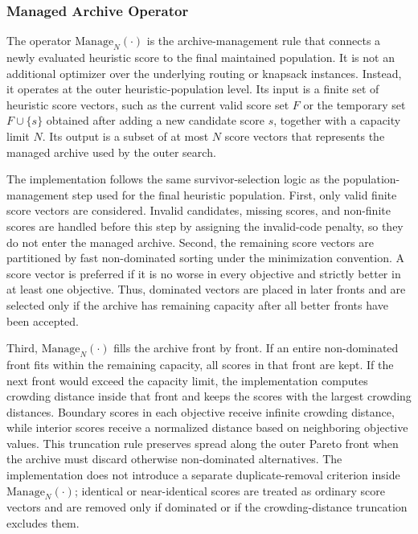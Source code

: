 \subsubsection{Managed Archive Operator}

The operator $\mathrm{Manage}_N(\cdot)$ is the archive-management rule that connects a newly evaluated heuristic score to the final maintained population. It is not an additional optimizer over the underlying routing or knapsack instances. Instead, it operates at the outer heuristic-population level. Its input is a finite set of heuristic score vectors, such as the current valid score set $F$ or the temporary set $F\cup\{s\}$ obtained after adding a new candidate score $s$, together with a capacity limit $N$. Its output is a subset of at most $N$ score vectors that represents the managed archive used by the outer search.

The implementation follows the same survivor-selection logic as the population-management step used for the final heuristic population. First, only valid finite score vectors are considered. Invalid candidates, missing scores, and non-finite scores are handled before this step by assigning the invalid-code penalty, so they do not enter the managed archive. Second, the remaining score vectors are partitioned by fast non-dominated sorting under the minimization convention. A score vector is preferred if it is no worse in every objective and strictly better in at least one objective. Thus, dominated vectors are placed in later fronts and are selected only if the archive has remaining capacity after all better fronts have been accepted.

Third, $\mathrm{Manage}_N(\cdot)$ fills the archive front by front. If an entire non-dominated front fits within the remaining capacity, all scores in that front are kept. If the next front would exceed the capacity limit, the implementation computes crowding distance inside that front and keeps the scores with the largest crowding distances. Boundary scores in each objective receive infinite crowding distance, while interior scores receive a normalized distance based on neighboring objective values. This truncation rule preserves spread along the outer Pareto front when the archive must discard otherwise non-dominated alternatives. The implementation does not introduce a separate duplicate-removal criterion inside $\mathrm{Manage}_N(\cdot)$; identical or near-identical scores are treated as ordinary score vectors and are removed only if dominated or if the crowding-distance truncation excludes them.

